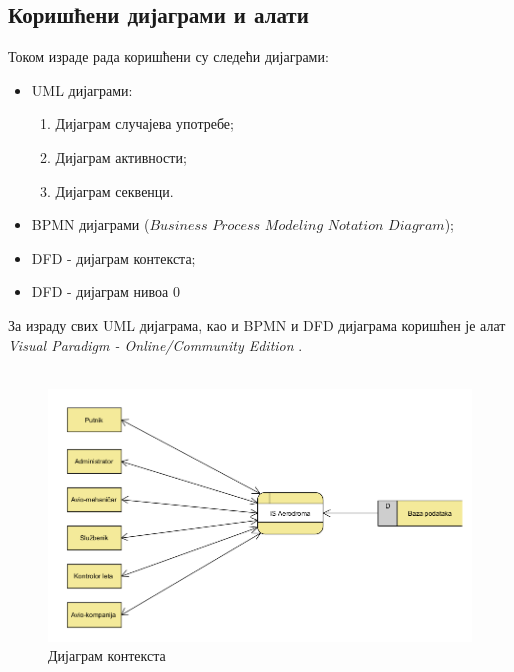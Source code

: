 \documentclass{article}
\begin{document}
\subsection{Коришћени дијаграми и алати}
Током израде рада коришћени су следећи дијаграми:
\begin{itemize}
    \item UML дијаграми:
        \begin{enumerate}
            \item Дијаграм случајева употребе;
            \item Дијаграм активности;
            \item Дијаграм секвенци.
        \end{enumerate}
    \item BPMN дијаграми ($Business$ $Process$ $Modeling$ $Notation$ $Diagram$);
    \item DFD - дијаграм контекста;
    \item DFD - дијаграм нивоа 0
\end{itemize}

За израду свих UML дијаграма, као 
и BPMN и DFD дијаграма коришћен је алат \textit{Visual Paradigm - Online/Community Edition} \cite{vp}.\\\\

\begin{figure}[h!]
    \begin{center}
        \includegraphics[width=1.1\textwidth]{Dijagrami_slike/dijagram_konteksta.png}
        \caption{Дијаграм контекста}
    \end{center}
\end{figure}
\end{document}
